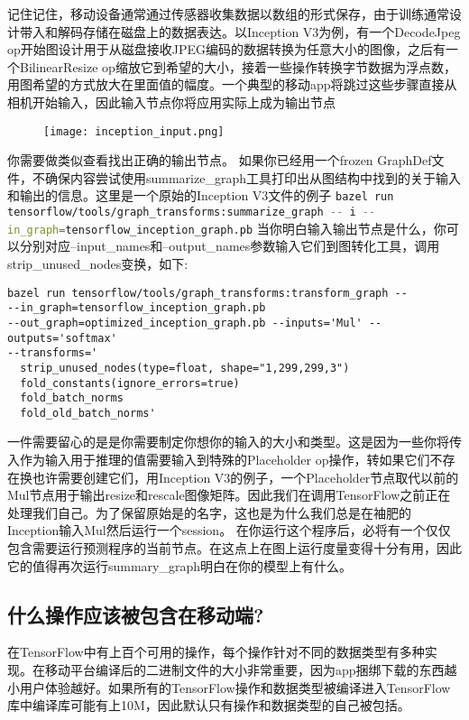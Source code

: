 记住记住，移动设备通常通过传感器收集数据以数组的形式保存，由于训练通常设计带入和解码存储在磁盘上的数据表达。以Inception V3为例，有一个DecodeJpeg op开始图设计用于从磁盘接收JPEG编码的数据转换为任意大小的图像，之后有一个BilinearResize op缩放它到希望的大小，接着一些操作转换字节数据为浮点数，用图希望的方式放大在里面值的幅度。一个典型的移动app将跳过这些步骤直接从相机开始输入，因此输入节点你将应用实际上成为输出节点
\begin{figure}[!h]
	\centering
	\texttt{[image: inception\_input.png]}
\end{figure}
你需要做类似查看找出正确的输出节点。
如果你已经用一个frozen GraphDef文件，不确保内容尝试使用summarize\_graph工具打印出从图结构中找到的关于输入和输出的信息。这里是一个原始的Inception V3文件的例子
\lstinline[language=Bash]{bazel run tensorflow/tools/graph_transforms:summarize_graph -- i --in_graph=tensorflow_inception_graph.pb}
当你明白输入输出节点是什么，你可以分别对应--input\_names和--output\_names参数输入它们到图转化工具，调用strip\_unused\_nodes变换，如下:
\begin{lstlisting}
bazel run tensorflow/tools/graph_transforms:transform_graph --
--in_graph=tensorflow_inception_graph.pb
--out_graph=optimized_inception_graph.pb --inputs='Mul' --outputs='softmax'
--transforms='
  strip_unused_nodes(type=float, shape="1,299,299,3")
  fold_constants(ignore_errors=true)
  fold_batch_norms
  fold_old_batch_norms'

\end{lstlisting}
一件需要留心的是是你需要制定你想你的输入的大小和类型。这是因为一些你将传入作为输入用于推理的值需要输入到特殊的Placeholder op操作，转如果它们不存在换也许需要创建它们，用Inception V3的例子，一个Placeholder节点取代以前的Mul节点用于输出resize和rescale图像矩阵。因此我们在调用TensorFlow之前正在处理我们自己。为了保留原始是的名字，这也是为什么我们总是在袖肥的Inception输入Mul然后运行一个session。
在你运行这个程序后，必将有一个仅仅包含需要运行预测程序的当前节点。在这点上在图上运行度量变得十分有用，因此它的值得再次运行summary\_graph明白在你的模型上有什么。
\subsection{什么操作应该被包含在移动端?}
在TensorFlow中有上百个可用的操作，每个操作针对不同的数据类型有多种实现。在移动平台编译后的二进制文件的大小非常重要，因为app捆绑下载的东西越小用户体验越好。如果所有的TensorFlow操作和数据类型被编译进入TensorFlow库中编译库可能有上10M，因此默认只有操作和数据类型的自己被包括。

